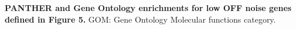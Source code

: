 \textbf{PANTHER and Gene Ontology enrichments for low OFF noise genes defined in Figure 5.} GOM: Gene Ontology Molecular functions category. 